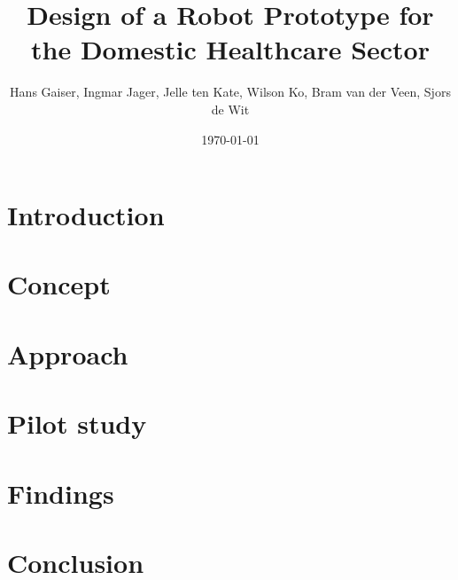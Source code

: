 \documentclass[a4paper,10pt,twocolumn]{article}
\begin{document}


\newcommand{\todo}[1]{\textbf{\textsc{\textcolor{red}{[#1]}}}}
\title{Design of a Robot Prototype for the Domestic Healthcare Sector}
\author{Hans Gaiser, Ingmar Jager, Jelle ten Kate, Wilson Ko, Bram van der Veen, Sjors de Wit}
\date{\today}

\maketitle



\section*{Introduction}
\label{problem}


\section*{Concept}
\label{concept}


\section*{Approach}
\label{approach}


\section*{Pilot study}
\label{simulation}


\section*{Findings}
\label{findings}


\section*{Conclusion}
\label{conclusion}


\printbibliography
\end{document}
